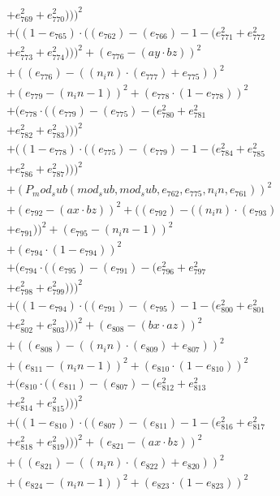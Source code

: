 \documentclass[10pt, a4paper]{article}
\begin{document}
\begin{align*}
& + e_{769}^{2} + e_{770}^{2})))^{2} \\
& + ((1 - e_{765})  \cdot  ((e_{762}) - (e_{766}) - 1 - (e_{771}^{2} + e_{772}^{2} \\
& + e_{773}^{2} + e_{774}^{2})))^{2} + (e_{776} - (ay  \cdot  bz))^{2} \\
& + ((e_{776}) - ((n_in)  \cdot  (e_{777}) + e_{775}))^{2} \\
& + (e_{779} - (n_in - 1))^{2} + (e_{778}  \cdot  (1 - e_{778}))^{2} \\
& + (e_{778}  \cdot  ((e_{779}) - (e_{775}) - (e_{780}^{2} + e_{781}^{2} \\
& + e_{782}^{2} + e_{783}^{2})))^{2} \\
& + ((1 - e_{778})  \cdot  ((e_{775}) - (e_{779}) - 1 - (e_{784}^{2} + e_{785}^{2} \\
& + e_{786}^{2} + e_{787}^{2})))^{2} \\
& + (P_mod_sub(mod_sub, mod_sub, e_{762}, e_{775}, n_in, e_{761}))^{2} \\
& + (e_{792} - (ax  \cdot  bz))^{2} + ((e_{792}) - ((n_in)  \cdot  (e_{793}) \\
& + e_{791}))^{2} + (e_{795} - (n_in - 1))^{2} \\
& + (e_{794}  \cdot  (1 - e_{794}))^{2} \\
& + (e_{794}  \cdot  ((e_{795}) - (e_{791}) - (e_{796}^{2} + e_{797}^{2} \\
& + e_{798}^{2} + e_{799}^{2})))^{2} \\
& + ((1 - e_{794})  \cdot  ((e_{791}) - (e_{795}) - 1 - (e_{800}^{2} + e_{801}^{2} \\
& + e_{802}^{2} + e_{803}^{2})))^{2} + (e_{808} - (bx  \cdot  az))^{2} \\
& + ((e_{808}) - ((n_in)  \cdot  (e_{809}) + e_{807}))^{2} \\
& + (e_{811} - (n_in - 1))^{2} + (e_{810}  \cdot  (1 - e_{810}))^{2} \\
& + (e_{810}  \cdot  ((e_{811}) - (e_{807}) - (e_{812}^{2} + e_{813}^{2} \\
& + e_{814}^{2} + e_{815}^{2})))^{2} \\
& + ((1 - e_{810})  \cdot  ((e_{807}) - (e_{811}) - 1 - (e_{816}^{2} + e_{817}^{2} \\
& + e_{818}^{2} + e_{819}^{2})))^{2} + (e_{821} - (ax  \cdot  bz))^{2} \\
& + ((e_{821}) - ((n_in)  \cdot  (e_{822}) + e_{820}))^{2} \\
& + (e_{824} - (n_in - 1))^{2} + (e_{823}  \cdot  (1 - e_{823}))^{2} \\

\end{align*}
\end{document}
